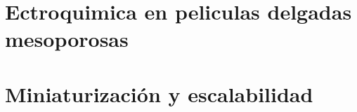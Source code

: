 	
	

 	

	


		




	 	

\section{Ectroquimica en peliculas delgadas mesoporosas}
	
\section{Miniaturización y escalabilidad}\label{sec:microfabricacion}\label{sec:intro_fotolito}
	


